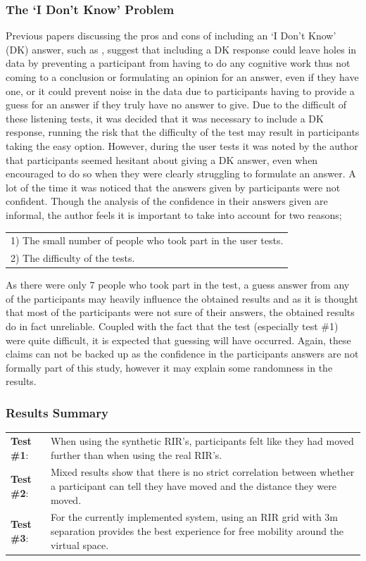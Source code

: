 \documentclass[../../main.tex]{subfiles}
\begin{document}
			\subsubsection{The `I Don't Know' Problem}
				Previous papers discussing the pros and cons of including an `I Don't Know' (DK) answer, such as \cite{DK}, suggest that including a DK response could leave holes in data by preventing a participant from having to do any cognitive work thus not coming to a conclusion or formulating an opinion for an answer, even if they have one, or it could prevent noise in the data due to participants having to provide a guess for an answer if they truly have no answer to give. Due to the difficult of these listening tests, it was decided that it was necessary to include a DK response, running the risk that the difficulty of the test may result in participants taking the easy option. However, during the user tests it was noted by the author that participants seemed hesitant about giving a DK answer, even when encouraged to do so when they were clearly struggling to formulate an answer. A lot of the time it was noticed that the answers given by participants were not confident. Though the analysis of the confidence in their answers given are informal, the author feels it is important to take into account for two reasons;
				\begin{tabular}{l}
				1) The small number of people who took part in the user tests.\\
				2) The difficulty of the tests.
				\end{tabular}

				As there were only 7 people who took part in the test, a guess answer from any of the participants may heavily influence the obtained results and as it is thought that most of the participants were not sure of their answers, the obtained results do in fact unreliable. Coupled with the fact that the test (especially test \#1) were quite difficult, it is expected that guessing will have occurred. Again, these claims can not be backed up as the confidence in the participants answers are not formally part of this study, however it may explain some randomness in the results.

			\subsubsection{Results Summary}

				\begin{tabular}{l p{} }
					\textbf{Test \#1}: & When using the synthetic \ac{RIR}'s, participants felt like they had moved further than when using the real \ac{RIR}'s. \\
					\textbf{Test \#2}: & Mixed results show that there is no strict correlation between whether a participant can tell they have moved and the distance they were moved. \\
					\textbf{Test \#3}: & For the currently implemented system, using an \ac{RIR} grid with 3m separation provides the best experience for free mobility around the virtual space.
				\end{tabular}
\end{document}
